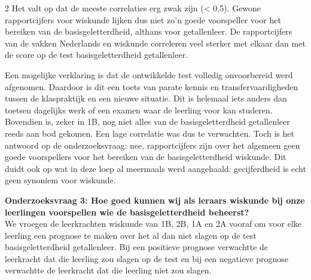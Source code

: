 \begin{multicols}{2}
Het valt op dat de meeste correlaties erg zwak zijn (< 0,5). Gewone rapportcijfers voor wiskunde lijken dus niet zo'n goede voorspeller voor het bereiken van de basisgeletterdheid, althans voor getallenleer. De rapportcijfers van de vakken Nederlands en wiskunde correleren veel sterker met elkaar dan met de score op de test basisgeletterdheid getallenleer. 

Een mogelijke verklaring is dat de ontwikkelde test volledig onvoorbereid werd afgenomen. Daardoor is dit een toets van parate kennis en transfervaardigheden tussen de klaspraktijk en een nieuwe situatie. Dit is helemaal iets anders dan toetsen dagelijks werk of een examen waar de leerling voor kan studeren. Bovendien is, zeker in 1B, nog niet alles van de basisgeletterdheid getallenleer reeds aan bod gekomen. Een lage correlatie was dus te verwachten. Toch is het antwoord op de onderzoeksvraag: nee, rapportcijfers zijn over het algemeen geen goede voorspellers voor het bereiken van de basisgeletterdheid wiskunde. Dit duidt ook op wat in deze loep al meermaals werd aangehaald: gecijferdheid is echt geen synoniem voor wiskunde.

\textbf{Onderzoeksvraag 3: Hoe goed kunnen wij als leraars wiskunde bij onze leerlingen voorspellen wie de basisgeletterdheid beheerst?}\\

We vroegen de leerkrachten wiskunde van 1B, 2B, 1A en 2A vooraf om voor elke leerling een prognose te maken over het al dan niet slagen op de test basisgeletterdheid getallenleer. Bij een positieve prognose verwachtte de leerkracht dat die leerling zou slagen op de test en bij een negatieve prognose verwachtte de leerkracht dat die leerling niet zou slagen.
\end{multicols}

